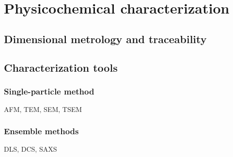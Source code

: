 \section{Physicochemical characterization}
\subsection{Dimensional metrology and traceability}

\subsection{Characterization tools}
\subsubsection{Single-particle method}
AFM, TEM, SEM, TSEM

\subsubsection{Ensemble methods}
DLS, DCS, SAXS


